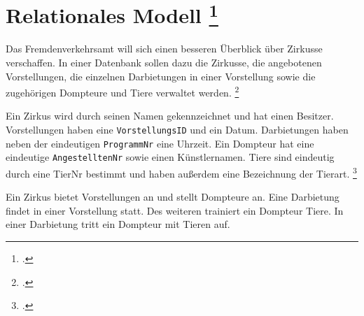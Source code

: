 \documentclass{lehramt-informatik-aufgabe}
\begin{document}
\section{ Relationales Modell
\footcite[Thema 2 Aufgabe 2 Seite 11]{examen:66116:2018:03}
}

Das Fremdenverkehrsamt will sich einen besseren Überblick über Zirkusse
verschaffen. In einer Datenbank sollen dazu die Zirkusse, die
angebotenen Vorstellungen, die einzelnen Darbietungen in einer
Vorstellung sowie die zugehörigen Dompteure und Tiere verwaltet werden.
\footcite[Seite 1-2, Aufgabe 1: ER-Diagramm Einstieg]{db:pu:1}

Ein Zirkus wird durch seinen Namen gekennzeichnet und hat einen
Besitzer. Vorstellungen haben eine \texttt{VorstellungsID} und ein
Datum. Darbietungen haben neben der eindeutigen \texttt{ProgrammNr} eine
Uhrzeit. Ein Dompteur hat eine eindeutige \texttt{AngestelltenNr} sowie
einen Künstlernamen. Tiere sind eindeutig durch eine TierNr bestimmt und
haben außerdem eine Bezeichnung der Tierart.
\footcite[Aufgabe 2, I. Das Entity-Relationship Modell, Seite 6]{examen:66114:2008:03}

Ein Zirkus bietet Vorstellungen an und stellt Dompteure an. Eine
Darbietung findet in einer Vorstellung statt. Des weiteren trainiert ein
Dompteur Tiere. In einer Darbietung tritt ein Dompteur mit Tieren auf.
\end{document}
